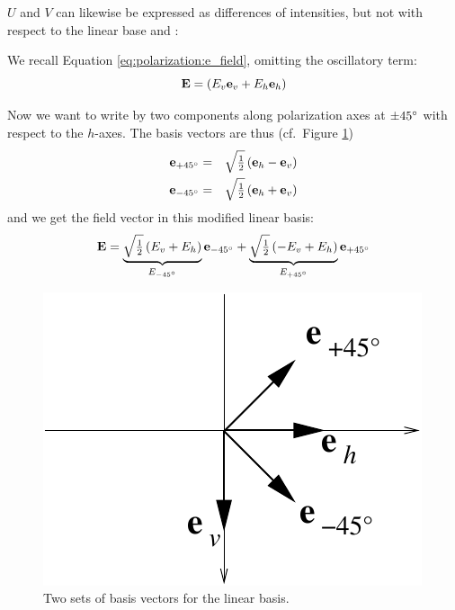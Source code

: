$U$ and $V$ can likewise be expressed as differences of intensities, but not
with respect to the linear base \eVrt and \eHor:

We recall Equation \ref{eq:polarization:e_field}, omitting the
oscillatory term:
\begin{equation}
  \label{eq:polarization:E_linbase}
  \mathbf{E}= \left(E_v \mathbf{e}_v +  E_h \mathbf{e}_h \right) 
\end{equation}

Now we want to write  by two components along polarization axes at
$\pm 45^\circ$ with respect to the $h$-axes. The basis vectors are
thus (cf.\ Figure \ref{fig:polarization:e45})
\begin{eqnarray}
  \label{eq:polarization:e_p45}
  \mathbf{e}_{+45^\circ} &=& \sqrt{\textstyle\frac{1}{2}} \left( \mathbf{e}_h - \mathbf{e}_v \right) \\
  \label{eq:polarization:e_m45}
  \mathbf{e}_{-45^\circ} &=& \sqrt{\textstyle\frac{1}{2}} \left( \mathbf{e}_h + \mathbf{e}_v \right) 
\end{eqnarray}
and we get the field vector in this modified linear basis:
\begin{equation}
  \label{eq:polarization:E_lin45base}
  \mathbf{E} = \underbrace{
               \sqrt{\textstyle\frac{1}{2}}\left(E_v +  E_h \right)}_{E_{-45^\circ}} 
               \mathbf{e}_{-45^\circ} 
              + \underbrace{
               \sqrt{\textstyle\frac{1}{2}}\left( -E_v +  E_h \right)}_{E_{+45^\circ}} 
               \mathbf{e}_{+45^\circ} 
\end{equation}
%
\begin{figure}
 \begin{center}
  \begin{minipage}[c]{0.9\textwidth}
   \begin{center}
    \includegraphics*[width=0.4\hsize]{pol_e45}
   \end{center}
  \end{minipage}
  \begin{minipage}[c]{0.9\textwidth}
   \caption{Two sets of basis vectors for the linear basis.}
   \label{fig:polarization:e45}
  \end{minipage}
 \end{center}
\end{figure}   

